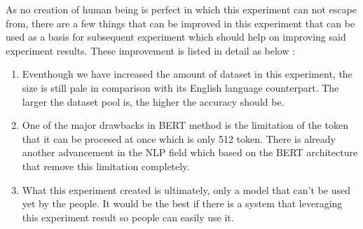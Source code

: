 As no creation of human being is perfect in which this experiment can not escape from, there are a few things that can be improved in this experiment that can be used as a basis for subsequent experiment which should help on improving said experiment results. These improvement is listed in detail as below :

\begin{enumerate}
    \item Eventhough we have increased the amount of dataset in this experiment, the size is still pale in comparison with its English language counterpart. The larger the dataset pool is, the higher the accuracy should be.

    \item One of the major drawbacks in BERT method is the limitation of the token that it can be procesed at once which is only 512 token. There is already another advancement in the NLP field which based on the BERT architecture that remove this limitation completely.

    \item What this experiment created is ultimately, only a model that can't be used yet by the people. It would be the best if there is a system that leveraging this experiment result so people can easily use it.

\end{enumerate}

